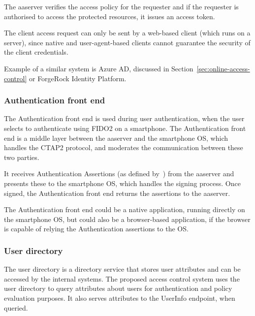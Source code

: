 The \acrshort{aaserver} verifies the access policy for the requester and if the requester is authorised to access the protected resources, it issues an access token.

The client access request can only be sent by a web-based client (which runs on a server), since native and user-agent-based clients cannot guarantee the security of the client credentials.

\bigskip \noindent
Example of a similar system is Azure AD, discussed in Section~\ref{sec:online-access-control} or ForgeRock Identity Platform\footnotemark.
% 
    
\subsubsection{Authentication front end}
The Authentication front end is used during user authentication, when the user selects to authenticate using FIDO2 on a smartphone. The Authentication front end is a middle layer between the \acrshort{aaserver} and the smartphone OS, which handles the CTAP2 protocol, and moderates the communication between these two parties.

It receives Authentication Assertions (as defined by~\cite{Balfanz2019Web1}) from the \acrshort{aaserver} and presents these to the smartphone OS, which handles the signing process. Once signed, the Authentication front end returns the assertions to the \acrshort{aaserver}.

The Authentication front end could be a native application, running directly on the smartphone OS, but could also be a browser-based application, if the browser is capable of relying the Authentication assertions to the OS\footnotemark.
% 

\subsubsection{User directory}
The user directory is a directory service that stores user attributes and can be accessed by the internal systems. The proposed access control system uses the user directory to query attributes about users for authentication and policy evaluation purposes. It also serves attributes to the UserInfo endpoint, when queried.

